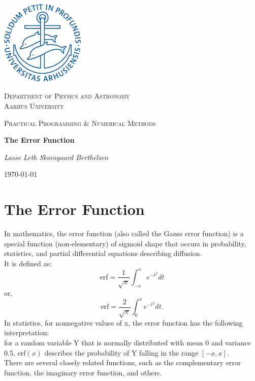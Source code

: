 \documentclass[12pt, a4paper, oneside]{article}
\begin{document}
	\begin{titlepage}
	\centering
	\includegraphics[width=0.3\textwidth]{logo.png}\par\vspace{0.5cm}
	{\scshape\Large Department of Physics and Astronomy \\ \LARGE Aarhus University \par}
	\vspace{1cm}
	{\scshape\Large Practical Programming \& Numerical Methods \par}
	\vspace{0.5cm}
	{\huge\bfseries The Error Function \par}
	\vspace{1cm}
	{\Large\itshape Lasse Leth Skovsgaard Berthelsen \par}
	\vfill
	{\large \today \par}
	\end{titlepage}
\newpage
\section*{The Error Function}
In mathematics, the error function (also called the Gauss error function) 
is a special function (non-elementary) of sigmoid shape that occurs in probability, 
statistics, and partial differential equations describing diffusion. \\
\noindent 
It is defined as:
\begin{equation}
\mbox{erf}=\frac{1}{\sqrt{\pi}}\int_{-x}^{x} e^{-t^2}dt
\end{equation}
or,
\begin{equation}
\mbox{erf}=\frac{2}{\sqrt{\pi}}\int_{0}^{x} e^{-t^2}dt.
\end{equation}
\break \noindent
In statistics, for nonnegative values of x, the error function has the following interpretation: \\
for a random variable Y that is normally distributed with mean 0 and variance 0.5, 
erf$(x)$ describes the probability of Y falling in the range $[-x, x]$.\\
\noindent
There are several closely related functions, such as the complementary error function, the imaginary error function, and others. 
\end{document}
